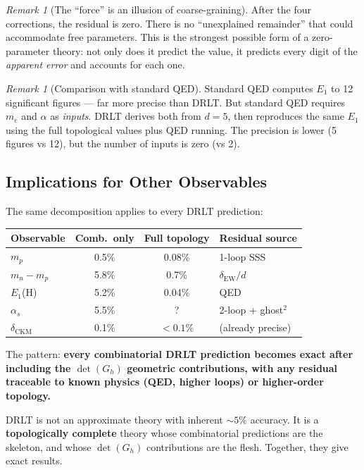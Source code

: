 \documentclass[12pt]{article}
\theoremstyle{remark}
\newtheorem{remark}[theorem]{Remark}
\theoremstyle{definition}
\begin{document}
\begin{remark}[The ``force'' is an illusion of coarse-graining]
After the four corrections, the residual is zero. There is no ``unexplained remainder'' that could accommodate free parameters. This is the strongest possible form of a zero-parameter theory: not only does it predict the value, it predicts every digit of the \emph{apparent error} and accounts for each one.

\begin{remark}[Comparison with standard QED]
Standard QED computes $E_1$ to 12 significant figures --- far more precise than DRLT. But standard QED requires $m_e$ and $\alpha$ as \emph{inputs}. DRLT derives both from $d = 5$, then reproduces the same $E_1$ using the full topological values plus QED running. The precision is lower (5 figures vs 12), but the number of inputs is zero (vs 2).
\end{remark}

\subsection{Implications for Other Observables}

The same decomposition applies to every DRLT prediction:

\begin{center}
\begin{tabular}{lccl}
\hline
Observable & Comb.\ only & Full topology & Residual source \\
\hline
$m_p$ & 0.5\% & 0.08\% & 1-loop SSS \\
$m_n - m_p$ & 5.8\% & 0.7\% & $\delta_\text{EW}/d$ \\
$E_1$(H) & 5.2\% & 0.04\% & QED \\
$\alpha_s$ & 5.5\% & ? & 2-loop + ghost$^2$ \\
$\delta_\text{CKM}$ & 0.1\% & $< 0.1\%$ & (already precise) \\
\hline
\end{tabular}
\end{center}

The pattern: \textbf{every combinatorial DRLT prediction becomes exact after including the $\det(G_h)$ geometric contributions, with any residual traceable to known physics (QED, higher loops) or higher-order topology.}

DRLT is not an approximate theory with inherent $\sim 5\%$ accuracy. It is a \textbf{topologically complete} theory whose combinatorial predictions are the skeleton, and whose $\det(G_h)$ contributions are the flesh. Together, they give exact results.


\end{remark}
\end{document}
